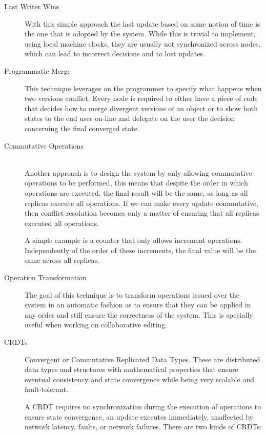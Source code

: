\begin{description}
\item[Last Writer Wins] With this simple approach the last update based on some notion of time is the one that is adopted by the system. While this is trivial to implement, using local machine clocks, they are usually not synchronized across nodes, which can lead to incorrect decisions and to lost updates.
	
\item[Programmatic Merge] This technique leverages on the programmer to specify what happens when two versions conflict. Every node is required to either have a piece of code that decides how to merge divergent versions of an object or to show both states to the end user on-line and delegate on the user the decision concerning the final converged state.

\item[Commutative Operations] \hfill \\
Another approach is to design the system by only allowing commutative operations to be performed, this means that despite the order in which operations are executed, the final result will be the same, as long as all replicas execute all operations. If we can make every update commutative, then conflict resolution becomes only a matter of ensuring that all replicas executed all operations.\par
	A simple example is a counter that only allows increment operations. Independently of the order of these increments, the final value will be the same across all replicas.
	
\item[Operation Transformation] The goal of this technique is to transform operations issued over the system in an automatic fashion as to ensure that they can be applied in any order and still ensure the correctness of the system. This is specially useful when working on collaborative editing.

\item[CRDTs] Convergent or Commutative Replicated Data Types. These are distributed data types and structures with mathematical properties that ensure eventual consistency and state convergence while being very scalable and fault-tolerant.\par
	A CRDT\cite{crdt} requires no synchronization during the execution of operations to ensure state convergence, an update executes immediately, unaffected by network latency, faults, or network failures. There are two kinds of CRDTs:\par
	

\end{description}
